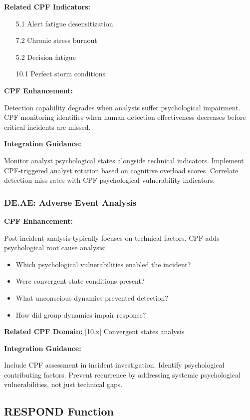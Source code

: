 \documentclass[11pt,a4paper]{article}
\begin{document}
\textbf{Related CPF Indicators:}
\begin{itemize}
\item [5.1] Alert fatigue desensitization
\item [7.2] Chronic stress burnout
\item [5.2] Decision fatigue
\item [10.1] Perfect storm conditions
\end{itemize}

\textbf{CPF Enhancement:}

Detection capability degrades when analysts suffer psychological impairment. CPF monitoring identifies when human detection effectiveness decreases before critical incidents are missed.

\textbf{Integration Guidance:}

Monitor analyst psychological states alongside technical indicators. Implement CPF-triggered analyst rotation based on cognitive overload scores. Correlate detection miss rates with CPF psychological vulnerability indicators.

\subsubsection{DE.AE: Adverse Event Analysis}

\textbf{CPF Enhancement:}

Post-incident analysis typically focuses on technical factors. CPF adds psychological root cause analysis:

\begin{itemize}
\item Which psychological vulnerabilities enabled the incident?
\item Were convergent state conditions present?
\item What unconscious dynamics prevented detection?
\item How did group dynamics impair response?
\end{itemize}

\textbf{Related CPF Domain:} [10.x] Convergent states analysis

\textbf{Integration Guidance:}

Include CPF assessment in incident investigation. Identify psychological contributing factors. Prevent recurrence by addressing systemic psychological vulnerabilities, not just technical gaps.

\subsection{RESPOND Function}
\end{document}
